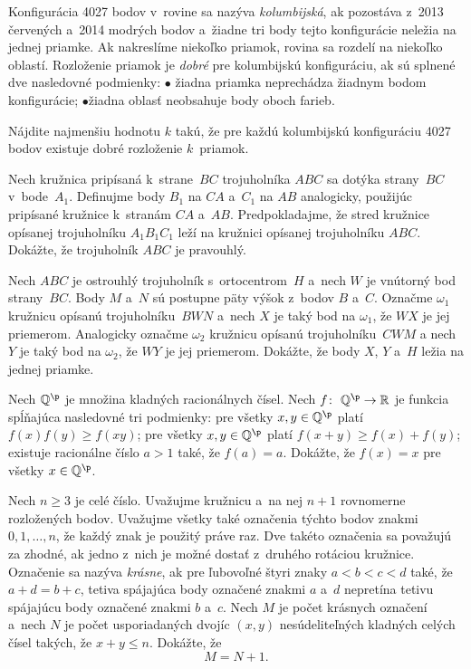 {%
Konfigurácia 4027 bodov v~rovine sa nazýva {\it kolumbijská}, ak pozostáva z~2013 červených a~2014 modrých bodov a~žiadne tri body tejto konfigurácie neležia na jednej priamke. Ak nakreslíme niekoľko priamok, rovina sa rozdelí na niekoľko oblastí. Rozloženie priamok je {\it dobré} pre kolumbijskú konfiguráciu, ak sú splnené dve nasledovné podmienky:
\ite $\bullet$ žiadna priamka neprechádza žiadnym bodom konfigurácie;
\ite $\bullet$žiadna oblasť neobsahuje body oboch farieb.

Nájdite najmenšiu hodnotu $k$ takú, že pre každú kolumbijskú konfiguráciu 4027 bodov existuje dobré rozloženie $k$~priamok.}

{%
Nech kružnica pripísaná k~strane~$BC$ trojuholníka $ABC$ sa dotýka strany~$BC$ v~bode~$A_1$. Definujme body $B_1$ na $CA$ a~$C_1$
na $AB$ analogicky, použijúc pripísané kružnice k~stranám $CA$ a~$AB$. Predpokladajme, že stred kružnice opísanej trojuholníku $A_1B_1C_1$
leží na kružnici opísanej trojuholníku $ABC$. Dokážte, že
trojuholník $ABC$ je pravouhlý.}

{%
Nech $ABC$ je ostrouhlý trojuholník s~ortocentrom~$H$ a~nech $W$ je vnútorný bod strany~$BC$.
Body $M$ a~$N$ sú postupne päty výšok z~bodov $B$ a~$C$. Označme $\omega_1$ kružnicu opísanú trojuholníku~$BW\!N$ a~nech $X$ je taký bod na $\omega_1$, že $W\!X$ je jej priemerom. Analogicky označme $\omega_2$ kružnicu opísanú trojuholníku~$CW\!M$
a nech $Y$ je taký bod na $\omega_2$, že $WY$ je jej priemerom. Dokážte, že body $X$, $Y$ a~$H$ ležia na jednej priamke.}

{%
Nech $\Bbb Q^{\p}$ je množina kladných racionálnych čísel. Nech $f\colon\ \Bbb Q^{\p}\to\Bbb R$ je funkcia spĺňajúca nasledovné tri podmienky:
pre všetky $x, y\in \Bbb Q^{\p}$ platí $f(x)f(y) \ge f(xy)$;
pre všetky $x, y\in \Bbb Q^{\p}$ platí $f(x+y)\ge f(x)+f(y)$;
existuje racionálne číslo $a>1$ také, že $f(a)=a$.
\endgraf\noindent
Dokážte, že $f(x)=x$ pre všetky $x\in \Bbb Q^{\p}$.}

{%
Nech $n\ge3$ je celé číslo. Uvažujme kružnicu a~na nej $n+1$ rovnomerne rozložených bodov. Uvažujme všetky také označenia týchto bodov znakmi $0, 1, \dots, n$, že každý znak je použitý práve raz. Dve takéto označenia sa považujú za zhodné, ak jedno z~nich je možné dostať z~druhého rotáciou kružnice.
Označenie sa nazýva {\it krásne}, ak pre ľubovoľné štyri znaky $a<b<c<d$ také, že $a+d=b+c$, tetiva spájajúca body označené znakmi $a$ a~$d$ nepretína tetivu spájajúcu body označené znakmi $b$ a~$c$.
Nech $M$ je počet krásnych označení a~nech $N$ je počet usporiadaných dvojíc $(x,y)$ nesúdeliteľných kladných celých čísel takých, že $x+y \le n$. Dokážte, že
$$
M=N+1.
$$
}

